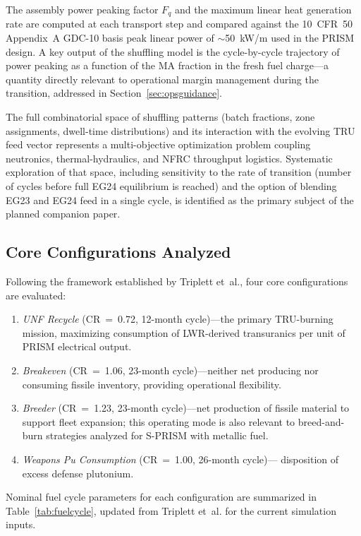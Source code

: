 \documentclass[10pt,twoside]{article}
\begin{document}
The assembly power peaking factor $F_q$ and the maximum linear
heat generation rate are computed at each transport step and compared
against the 10~CFR~50 Appendix~A GDC-10 basis peak linear power
of $\sim$50~kW/m used in the PRISM design.\cite{NRC1994}
A key output of the shuffling model is the cycle-by-cycle trajectory
of power peaking as a function of the MA fraction in the fresh fuel
charge---a quantity directly relevant to operational margin management
during the transition, addressed in Section~\ref{sec:opsguidance}.

The full combinatorial space of shuffling patterns (batch fractions,
zone assignments, dwell-time distributions) and its interaction with
the evolving TRU feed vector represents a multi-objective optimization
problem coupling neutronics, thermal-hydraulics, and NFRC throughput
logistics.  Systematic exploration of that space, including
sensitivity to the rate of transition (number of cycles before full
EG24 equilibrium is reached) and the option of blending EG23 and
EG24 feed in a single cycle, is identified as the primary subject of
the planned companion paper.

\subsection{Core Configurations Analyzed}

Following the framework established by Triplett et~al.,\cite{Triplett2012}
four core configurations are evaluated:
\begin{enumerate}
  \item \textit{UNF Recycle} (CR~=~0.72, 12-month cycle)---the primary
        TRU-burning mission, maximizing consumption of LWR-derived
        transuranics per unit of PRISM electrical output.
  \item \textit{Breakeven} (CR~=~1.06, 23-month cycle)---neither net
        producing nor consuming fissile inventory, providing
        operational flexibility.
  \item \textit{Breeder} (CR~=~1.23, 23-month cycle)---net production
        of fissile material to support fleet expansion; this operating
        mode is also relevant to breed-and-burn strategies analyzed
        for S-PRISM with metallic fuel.\cite{Hoang2022}
  \item \textit{Weapons Pu Consumption} (CR~=~1.00, 26-month cycle)---
        disposition of excess defense plutonium.
\end{enumerate}

Nominal fuel cycle parameters for each configuration are summarized in
Table~\ref{tab:fuelcycle}, updated from Triplett et~al.\cite{Triplett2012}
for the current simulation inputs.
\end{document}
